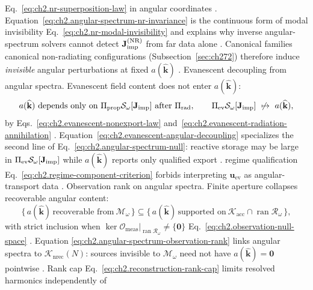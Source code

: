 Eq.~\eqref{eq:ch2.nr-superposition-law} in angular coordinates
\cite{stratton1941}. Equation~\eqref{eq:ch2.angular-spectrum-nr-invariance}
is the continuous form of modal invisibility Eq.~\eqref{eq:ch2.nr-modal-invisibility} and
explains why inverse angular-spectrum solvers cannot detect
\(\mathbf{J}_{\mathrm{imp}}^{\mathrm{(NR)}}\) from far data alone \cite{stratton1941}. Canonical families
canonical non-radiating configurations (Subsection~\ref{sec:ch272}) therefore induce \emph{invisible} angular
perturbations at fixed \(a(\widehat{\mathbf{k}})\) \cite{harrington2001}.
Evanescent decoupling from angular spectra. Evanescent field content does not enter \(a(\widehat{\mathbf{k}})\):
\begin{equation}
\label{eq:ch2.evanescent-angular-decoupling}
a(\widehat{\mathbf{k}})
\ \text{depends only on}\ 
\Pi_{\mathrm{prop}}\mathcal{S}_\omega[\Jimp]
\ \text{after}\ \Pi_{\mathrm{rad}},
\qquad
\Pi_{\mathrm{ev}}\mathcal{S}_\omega[\Jimp]
\ \not\mapsto\ a(\widehat{\mathbf{k}}),
\end{equation}
by Eqs.~\eqref{eq:ch2.evanescent-nonexport-law} and~\eqref{eq:ch2.evanescent-radiation-annihilation}
\cite{stratton1941}. Equation~\eqref{eq:ch2.evanescent-angular-decoupling}
specializes the second line of Eq.~\eqref{eq:ch2.angular-spectrum-null}:
reactive storage may be large in \(\Pi_{\mathrm{ev}}\mathcal{S}_\omega[\mathbf{J}_{\mathrm{imp}}]\) while
\(a(\widehat{\mathbf{k}})\) reports only qualified export \cite{stratton1941}. regime qualification
Eq.~\eqref{eq:ch2.regime-component-criterion} forbids interpreting \(\mathbf{u}_{\mathrm{ev}}\) as
angular-transport data \cite{harrington2001}.
Observation rank on angular spectra. Finite aperture collapses recoverable angular content:
\begin{equation}
\label{eq:ch2.angular-spectrum-observation-rank}
\{\,a(\widehat{\mathbf{k}})\,\text{recoverable from}\ \mathcal{M}_\omega\,\}
\subseteq
\{\,a(\widehat{\mathbf{k}})\,\text{supported on}\ \mathcal{K}_{\mathrm{acc}}\cap\operatorname{ran}\mathcal{R}_\omega\,\},
\end{equation}
with strict inclusion when \(\ker\mathcal{O}_{\mathrm{meas}}\big|_{\operatorname{ran}\mathcal{R}_\omega}\neq\{\mathbf{0}\}\)
Eq.~\eqref{eq:ch2.observation-null-space} \cite{stratton1941}. Equation
\eqref{eq:ch2.angular-spectrum-observation-rank} links angular spectra to
\(\mathcal{K}_{\mathrm{nrec}}(N)\): sources invisible to \(\mathcal{M}_\omega\) need not have
\(a(\widehat{\mathbf{k}})=\mathbf{0}\) pointwise \cite{stratton1941}. Rank cap
Eq.~\eqref{eq:ch2.reconstruction-rank-cap} limits resolved harmonics independently of
